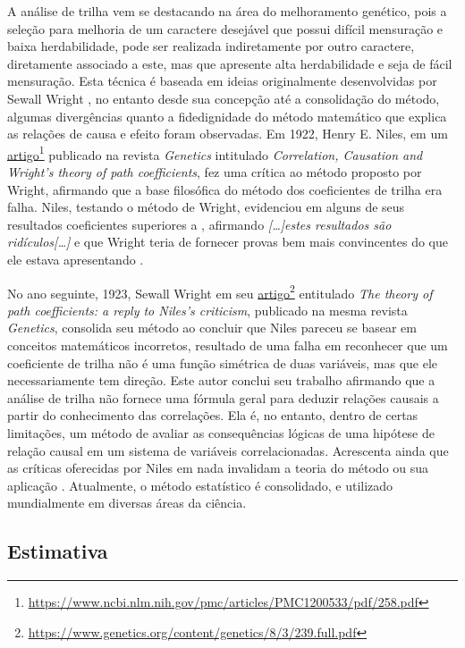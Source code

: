 \documentclass[
]{book}
\begin{document}
A análise de trilha vem se destacando na área do melhoramento genético, pois a seleção para melhoria de um caractere desejável que possui difícil mensuração e baixa herdabilidade, pode ser realizada indiretamente por outro caractere, diretamente associado a este, mas que apresente alta herdabilidade e seja de fácil mensuração. Esta técnica é baseada em ideias originalmente desenvolvidas por Sewall Wright \citep{Wright1921}, no entanto desde sua concepção até a consolidação do método, algumas divergências quanto a fidedignidade do método matemático que explica as relações de causa e efeito foram observadas. Em 1922, Henry E. Niles, em um \href{https://www.ncbi.nlm.nih.gov/pmc/articles/PMC1200533/pdf/258.pdf}{artigo}\footnote{\url{https://www.ncbi.nlm.nih.gov/pmc/articles/PMC1200533/pdf/258.pdf}} publicado na revista \emph{Genetics} intitulado \emph{Correlation, Causation and Wright's theory of path coefficients}, fez uma crítica ao método proposto por Wright, afirmando que a base filosófica do método dos coeficientes de trilha era falha. Niles, testando o método de Wright, evidenciou em alguns de seus resultados coeficientes superiores a \textbar, afirmando \emph{{[}\ldots{]}estes resultados são ridículos{[}\ldots{]}} e que Wright teria de fornecer provas bem mais convincentes do que ele estava apresentando \citet{Niles1922}.

No ano seguinte, 1923, Sewall Wright em seu \href{https://www.genetics.org/content/genetics/8/3/239.full.pdf}{artigo}\footnote{\url{https://www.genetics.org/content/genetics/8/3/239.full.pdf}} entitulado \emph{The theory of path coefficients: a reply to Niles's criticism}, publicado na mesma revista \emph{Genetics}, consolida seu método ao concluir que Niles pareceu se basear em conceitos matemáticos incorretos, resultado de uma falha em reconhecer que um coeficiente de trilha não é uma função simétrica de duas variáveis, mas que ele necessariamente tem direção. Este autor conclui seu trabalho afirmando que a análise de trilha não fornece uma fórmula geral para deduzir relações causais a partir do conhecimento das correlações. Ela é, no entanto, dentro de certas limitações, um método de avaliar as consequências lógicas de uma hipótese de relação causal em um sistema de variáveis correlacionadas. Acrescenta ainda que as críticas oferecidas por Niles em nada invalidam a teoria do método ou sua aplicação \citep{Wright1923}. Atualmente, o método estatístico é consolidado, e utilizado mundialmente em diversas áreas da ciência.

\hypertarget{estimativa}{%
\subsection{Estimativa}\label{estimativa}}
\end{document}
